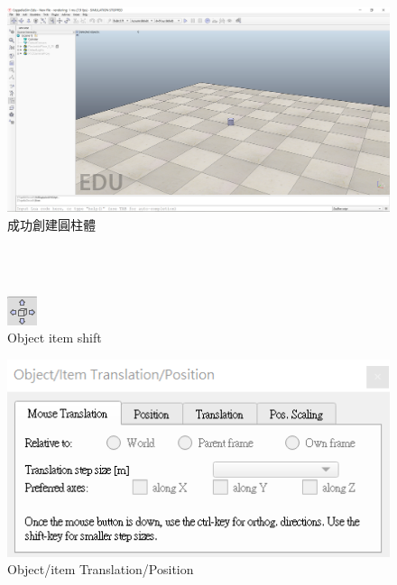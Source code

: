 \documentclass[14pt,a4paper]{report}  %
\begin{document}
{{{\begin{itemize}
\begin{enumerate}
      \begin{figure}[hbt!]
        \centering
        \includegraphics[scale=0.4]{add_cylinder_at_scene.png} 
        \caption{成功創建圓柱體}
        \label{fig_add_cylinder_at_scene:scale}
      \end{figure}
      \hspace*{\fill} \\
      \hspace*{\fill} \\
      
      \begin{figure}[hbt!]
        \centering
        \includegraphics[scale=0.75]{Object_item_shift.png}
        \caption{Object item shift}
        \label{fig_Object_item_shift:scale}
      \end{figure}
        
      \begin{figure}[hbt!]
        \centering
        \includegraphics[scale=0.75]{Object_item_Translation_Position.png}
        \caption{Object/item Translation/Position}
        \label{fig_Object_item_Translation_Position.png:scale}
        \end{figure}      
      

\end{enumerate}
\end{itemize}}}}
\end{document}
